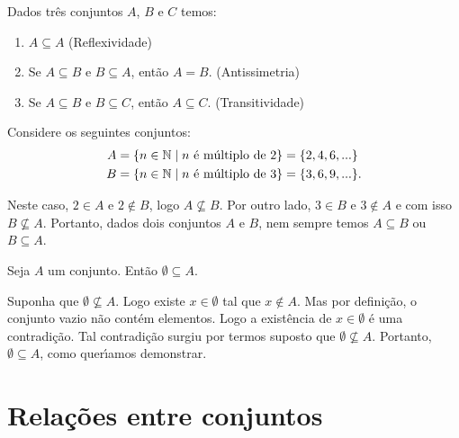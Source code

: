 \begin{proposicao}
    Dados tr\^es conjuntos $A$, $B$ e $C$ temos:
    \begin{enumerate}[label={\roman*})]
        \item $A\subseteq A$ (Reflexividade)
        \item Se $A\subseteq B \mbox{ e } B\subseteq A$, ent{\~a}o $A=B$. (Antissimetria)
        \item Se $A\subseteq B$ e $B\subseteq C$, ent{\~a}o $A\subseteq C$. (Transitividade)
    \end{enumerate}
\end{proposicao}


Considere os seguintes conjuntos:
\begin{align*}
    A &= \{ n \in \mathbb{N} \mid n \mbox{ {\'e} m{\'u}ltiplo de } 2\} = \{2,4,6,...\}\\
    B &= \{n \in \mathbb{N} \mid n \mbox{ {\'e} m{\'u}ltiplo de } 3\} = \{3,6,9,...\}.
\end{align*}


Neste caso, $2 \in A$ e $2 \notin B$, logo $A \nsubseteq B$. Por outro lado, $3 \in B$ e $3 \notin A$ e com isso $B \nsubseteq A$. Portanto, dados dois conjuntos $A$ e $B$, nem sempre temos $A \subseteq B$ ou $B \subseteq A$.

\begin{proposicao}
    Seja $A$ um conjunto. Ent{\~a}o $ \emptyset \subseteq A$.
\end{proposicao}
\begin{prova}
    Suponha que $\emptyset \nsubseteq A$. Logo existe $x \in \emptyset$ tal que $x \notin A$. Mas por defini{\c c}{\~a}o, o conjunto vazio n{\~a}o cont{\'e}m elementos. Logo a exist\^encia de $x \in \emptyset$ {\'e} uma contradi{\c c}{\~a}o. Tal contradi\c{c}\~ao surgiu por termos suposto que $\emptyset \nsubseteq A$. Portanto, $\emptyset \subseteq A$, como quer{\'\i}amos demonstrar.
\end{prova}

\section{Rela{\c c}{\~o}es entre conjuntos}

